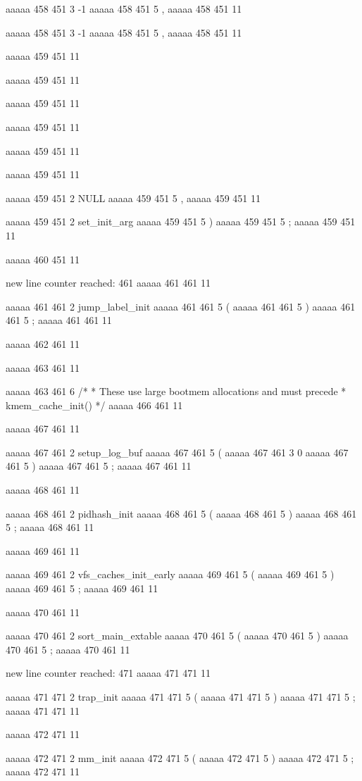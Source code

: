 {aaaaa 458 451
3
-1
aaaaa 458 451
5
,
aaaaa 458 451
11
 
aaaaa 458 451
3
-1
aaaaa 458 451
5
,
aaaaa 458 451
11


aaaaa 459 451
11
	
aaaaa 459 451
11
	
aaaaa 459 451
11
	
aaaaa 459 451
11
 
aaaaa 459 451
11
 
aaaaa 459 451
11
 
aaaaa 459 451
2
NULL
aaaaa 459 451
5
,
aaaaa 459 451
11
 
aaaaa 459 451
2
set_init_arg
aaaaa 459 451
5
)
aaaaa 459 451
5
;
aaaaa 459 451
11


aaaaa 460 451
11


new line counter reached: 461
aaaaa 461 461
11
	
aaaaa 461 461
2
jump_label_init
aaaaa 461 461
5
(
aaaaa 461 461
5
)
aaaaa 461 461
5
;
aaaaa 461 461
11


aaaaa 462 461
11


aaaaa 463 461
11
	
aaaaa 463 461
6
/*
	 * These use large bootmem allocations and must precede
	 * kmem_cache_init()
	 */
aaaaa 466 461
11


aaaaa 467 461
11
	
aaaaa 467 461
2
setup_log_buf
aaaaa 467 461
5
(
aaaaa 467 461
3
0
aaaaa 467 461
5
)
aaaaa 467 461
5
;
aaaaa 467 461
11


aaaaa 468 461
11
	
aaaaa 468 461
2
pidhash_init
aaaaa 468 461
5
(
aaaaa 468 461
5
)
aaaaa 468 461
5
;
aaaaa 468 461
11


aaaaa 469 461
11
	
aaaaa 469 461
2
vfs_caches_init_early
aaaaa 469 461
5
(
aaaaa 469 461
5
)
aaaaa 469 461
5
;
aaaaa 469 461
11


aaaaa 470 461
11
	
aaaaa 470 461
2
sort_main_extable
aaaaa 470 461
5
(
aaaaa 470 461
5
)
aaaaa 470 461
5
;
aaaaa 470 461
11


new line counter reached: 471
aaaaa 471 471
11
	
aaaaa 471 471
2
trap_init
aaaaa 471 471
5
(
aaaaa 471 471
5
)
aaaaa 471 471
5
;
aaaaa 471 471
11


aaaaa 472 471
11
	
aaaaa 472 471
2
mm_init
aaaaa 472 471
5
(
aaaaa 472 471
5
)
aaaaa 472 471
5
;
aaaaa 472 471
11


}
